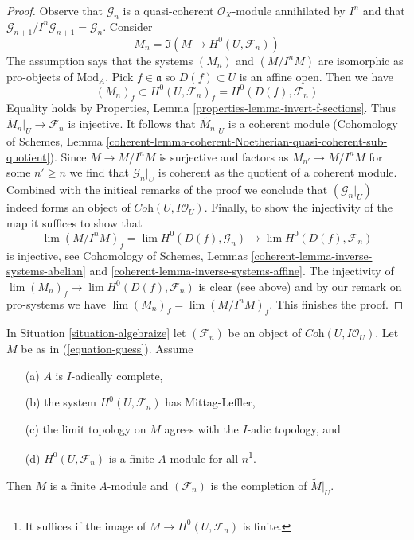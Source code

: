 \begin{proof}
Observe that $\mathcal{G}_n$ is a quasi-coherent $\mathcal{O}_X$-module
annihilated by $I^n$ and that
$\mathcal{G}_{n + 1}/I^n\mathcal{G}_{n + 1} = \mathcal{G}_n$.
Consider
$$
M_n = \Im(M \longrightarrow H^0(U, \mathcal{F}_n))
$$
The assumption says that the systems $(M_n)$ and
$(M/I^nM)$ are isomorphic as pro-objects of $\text{Mod}_A$.
Pick $f \in \mathfrak a$ so $D(f) \subset U$ is an affine open. Then we have
$$
(M_n)_f \subset H^0(U, \mathcal{F}_n)_f = H^0(D(f), \mathcal{F}_n)
$$
Equality holds by Properties, Lemma \ref{properties-lemma-invert-f-sections}.
Thus $\widetilde{M_n}|_U \to \mathcal{F}_n$ is injective.
It follows that $\widetilde{M_n}|_U$ is a coherent module
(Cohomology of Schemes, Lemma
\ref{coherent-lemma-coherent-Noetherian-quasi-coherent-sub-quotient}).
Since $M \to M/I^nM$ is surjective and factors as
$M_{n'} \to M/I^nM$ for some $n' \geq n$ we find that $\mathcal{G}_n|_U$
is coherent as the quotient of a coherent module.
Combined with the initical remarks of the proof we conclude
that $(\mathcal{G}_n|_U)$ indeed forms an object
of $\textit{Coh}(U, I\mathcal{O}_U)$.
Finally, to show the injectivity of the map
it suffices to show that
$$
\lim (M/I^nM)_f = \lim H^0(D(f), \mathcal{G}_n) \to
\lim H^0(D(f), \mathcal{F}_n)
$$
is injective, see Cohomology of Schemes, Lemmas
\ref{coherent-lemma-inverse-systems-abelian} and
\ref{coherent-lemma-inverse-systems-affine}.
The injectivity of $\lim (M_n)_f \to \lim H^0(D(f), \mathcal{F}_n)$
is clear (see above) and by our remark on pro-systems we have
$\lim (M_n)_f = \lim (M/I^nM)_f$. This finishes the proof.
\end{proof}

\begin{lemma}
\label{lemma-when-done}
In Situation \ref{situation-algebraize} let $(\mathcal{F}_n)$ be an object
of $\textit{Coh}(U, I\mathcal{O}_U)$. Let $M$ be as in (\ref{equation-guess}).
Assume
\begin{enumerate}
\item[(a)] $A$ is $I$-adically complete,
\item[(b)] the system $H^0(U, \mathcal{F}_n)$ has Mittag-Leffler,
\item[(c)] the limit topology on $M$ agrees with the $I$-adic topology, and
\item[(d)] $H^0(U, \mathcal{F}_n)$ is a finite $A$-module for all
$n$\footnote{It suffices if the image of $M \to H^0(U, \mathcal{F}_n)$
is finite.}.
\end{enumerate}
Then $M$ is a finite $A$-module and $(\mathcal{F}_n)$ is the
completion of $\widetilde{M}|_U$.
\end{lemma}

